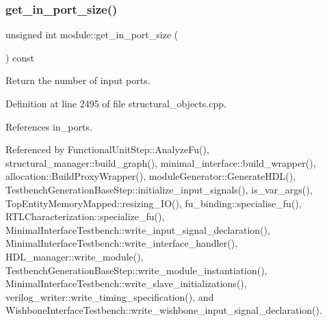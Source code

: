 \subsubsection{\texorpdfstring{get\+\_\+in\+\_\+port\+\_\+size()}{get\_in\_port\_size()}}
{\footnotesize\ttfamily unsigned int module\+::get\+\_\+in\+\_\+port\+\_\+size (\begin{DoxyParamCaption}{ }\end{DoxyParamCaption}) const}



Return the number of input ports. 



Definition at line 2495 of file structural\+\_\+objects.\+cpp.



References in\+\_\+ports.



Referenced by Functional\+Unit\+Step\+::\+Analyze\+Fu(), structural\+\_\+manager\+::build\+\_\+graph(), minimal\+\_\+interface\+::build\+\_\+wrapper(), allocation\+::\+Build\+Proxy\+Wrapper(), module\+Generator\+::\+Generate\+H\+D\+L(), Testbench\+Generation\+Base\+Step\+::initialize\+\_\+input\+\_\+signals(), is\+\_\+var\+\_\+args(), Top\+Entity\+Memory\+Mapped\+::resizing\+\_\+\+I\+O(), fu\+\_\+binding\+::specialise\+\_\+fu(), R\+T\+L\+Characterization\+::specialize\+\_\+fu(), Minimal\+Interface\+Testbench\+::write\+\_\+input\+\_\+signal\+\_\+declaration(), Minimal\+Interface\+Testbench\+::write\+\_\+interface\+\_\+handler(), H\+D\+L\+\_\+manager\+::write\+\_\+module(), Testbench\+Generation\+Base\+Step\+::write\+\_\+module\+\_\+instantiation(), Minimal\+Interface\+Testbench\+::write\+\_\+slave\+\_\+initializations(), verilog\+\_\+writer\+::write\+\_\+timing\+\_\+specification(), and Wishbone\+Interface\+Testbench\+::write\+\_\+wishbone\+\_\+input\+\_\+signal\+\_\+declaration().

